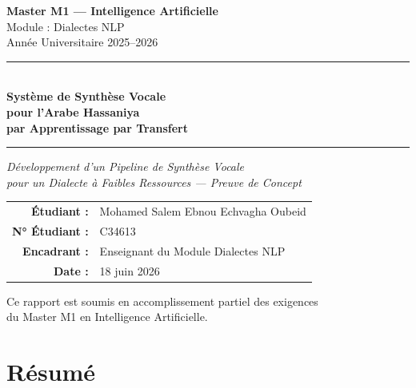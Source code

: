 \documentclass[12pt,a4paper]{article}
\begin{document}
\begin{titlepage}
\begin{center}

\vspace*{1cm}

{\large \textbf{Master M1 --- Intelligence Artificielle}}\\[0.3cm]
{\large Module : Dialectes NLP}\\[0.3cm]
{\large Année Universitaire 2025--2026}

\vspace{2cm}

\rule{\textwidth}{1.5pt}\\[0.5cm]
{\Huge \textbf{Système de Synthèse Vocale\\pour l'Arabe Hassaniya\\par Apprentissage par Transfert}}\\[0.5cm]
\rule{\textwidth}{1.5pt}

\vspace{1.5cm}

{\Large \textit{Développement d'un Pipeline de Synthèse Vocale\\pour un Dialecte à Faibles Ressources — Preuve de Concept}}

\vspace{2cm}

\begin{tabular}{rl}
    \textbf{Étudiant :} & Mohamed Salem Ebnou Echvagha Oubeid \\
    \textbf{N° Étudiant :} & C34613 \\
    \textbf{Encadrant :} & Enseignant du Module Dialectes NLP \\
    \textbf{Date :} & 18 juin 2026 \\
\end{tabular}

\vfill

{\small Ce rapport est soumis en accomplissement partiel des exigences\\
du Master M1 en Intelligence Artificielle.}

\end{center}
\end{titlepage}


\section*{Résumé}
\end{document}
